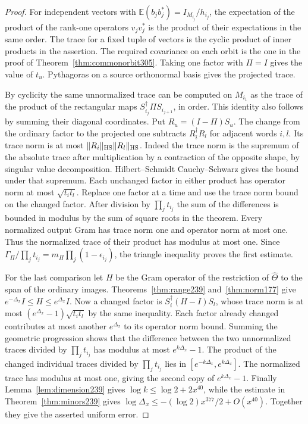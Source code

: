 \documentclass[a4paper,11pt]{article}
\theoremstyle{definition}
\theoremstyle{remark}
\numberwithin{equation}{section}
\begin{document}
\begin{proof}
For independent vectors with
\(\mathbb E(b_jb_j^*)=I_{M_{i_j}}/h_{i_j}\), the expectation
of the product of the rank-one operators \(v_jv_j^*\)
is the product of their expectations in the same order.
The trace for a fixed tuple of vectors is the cyclic
product of inner products in the assertion. The required
covariance on each orbit is the one in the proof of
Theorem~\ref{thm:commonorbit305}. Taking one factor with
\(\Pi=I\) gives the value of \(t_u\). Pythagoras on a
source orthonormal basis gives the projected trace.

By cyclicity the same unnormalized trace can be computed
on \(M_{i_1}\) as the trace of the product of the rectangular
maps \(S_{i_j}^\dagger\Pi S_{i_{j+1}}\), in order. This
identity also follows by summing their diagonal coordinates.
Put \(R_u=(I-\Pi)S_u\). The change from the ordinary
factor to the projected one subtracts \(R_i^\dagger R_l\)
for adjacent words \(i,l\). Its trace norm is at most
\(\|R_i\|_{\rm HS}\|R_l\|_{\rm HS}\). Indeed the trace norm
is the supremum of the absolute trace after multiplication
by a contraction of the opposite shape, by singular value
decomposition. Hilbert--Schmidt Cauchy--Schwarz gives the
bound under that supremum. Each unchanged factor in
either product has operator norm at most \(\sqrt{t_i t_l}\).
Replace one factor at a time and use the trace norm bound
on the changed factor. After division by \(\prod_jt_{i_j}\)
the sum of the differences is bounded in modulus by the
sum of square roots in the theorem. Every normalized output
Gram has trace norm one and operator norm at most one.
Thus the normalized trace of their product has modulus
at most one. Since
\(\Gamma_\Pi/\prod_jt_{i_j}=m_\Pi\prod_j(1-\epsilon_{i_j})\),
the triangle inequality proves the first estimate.

For the last comparison let \(H\) be the Gram operator of
the restriction of \(\widehat\Theta\) to the span of the
ordinary images. Theorems~\ref{thm:range239}
and~\ref{thm:norm177} give \(e^{-\Delta_x}I\le H\le
e^{\Delta_x}I\). Now a changed factor is
\(S_i^\dagger(H-I)S_l\), whose trace norm is at most
\((e^{\Delta_x}-1)\sqrt{t_i t_l}\) by the same inequality.
Each factor already changed contributes at most another
\(e^{\Delta_x}\) to its operator norm bound. Summing the
geometric progression shows that the difference between
the two unnormalized traces divided by \(\prod_jt_{i_j}\)
has modulus at most \(e^{k\Delta_x}-1\). The product of
the changed individual traces divided by \(\prod_jt_{i_j}\)
lies in \([e^{-k\Delta_x},e^{k\Delta_x}]\). The normalized
trace has modulus at most one, giving the second copy of
\(e^{k\Delta_x}-1\). Finally Lemma~\ref{lem:dimension239}
gives \(\log k\le\log 2+2x^{40}\), while the estimate
in Theorem~\ref{thm:minors239} gives
\(\log\Delta_x\le-(\log 2)x^{377}/2+O(x^{40})\).
Together they give the asserted uniform error.
\end{proof}
\end{document}
